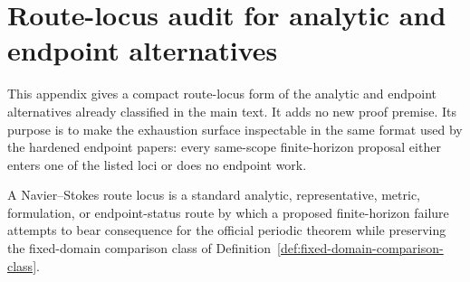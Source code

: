 \clearpage
\section{Route-locus audit for analytic and endpoint alternatives}\label{sec:ns-route-locus-audit}
This appendix gives a compact route-locus form of the analytic and endpoint alternatives already classified in the main text. It adds no new proof premise. Its purpose is to make the exhaustion surface inspectable in the same format used by the hardened endpoint papers: every same-scope finite-horizon proposal either enters one of the listed loci or does no endpoint work.

\begin{definition}
A Navier--Stokes route locus is a standard analytic, representative, metric, formulation, or endpoint-status route by which a proposed finite-horizon failure attempts to bear consequence for the official periodic theorem while preserving the fixed-domain comparison class of Definition~\ref{def:fixed-domain-comparison-class}.
\end{definition}

